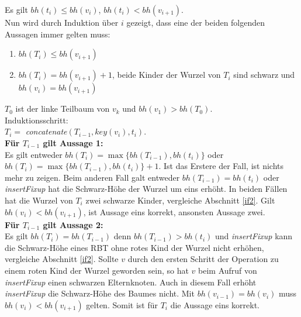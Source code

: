 \documentclass[a4paper,12pt]{article}
\begin{document}
\noindent Es gilt $\mathit{bh} \left(t_i \right) \leq \mathit{bh} \left(v_{i} \right)$, $\mathit{bh} \left(t_i \right) < \mathit{bh} \left(v_{i+1} \right)$.\\
Nun wird durch Induktion über $i$ gezeigt, dass eine der beiden folgenden Aussagen immer gelten muss:\\
\bigskip
\begin{enumerate}
	\item  $\mathit{bh} \left(T_{i} \right) \leq  \mathit{bh} \left(v_{i+1} \right)$
	\item $\mathit{bh} \left(T_{i} \right) =  \mathit{bh} \left(v_{i+1} \right) +1$, beide Kinder der Wurzel von $T_i$ sind schwarz und $\mathit{bh} \left(v_{i} \right) = \mathit{bh} \left(v_{i+1} \right)$
\end{enumerate}
$T_0$ ist der linke Teilbaum von $v_k$ und $\mathit{bh} \left(v_{1} \right) > \mathit{bh} \left(T_{0} \right)$.\\
Induktionsschritt:\\
$T_i =$ \textit{concatenate}$\left(T_{i-1}, \textit{key}(v_i), t_i\right)$.\\

\noindent \textbf{Für $T_{i-1}$ gilt Aussage 1:}\\
Es gilt entweder $\mathit{bh} \left(T_{i} \right) = \max\{\mathit{bh} \left(T_{i-1}\right), \mathit{bh} \left(t_{i} \right) \} $  oder \\ $\mathit{bh} \left(T_{i} \right) = \max\{\mathit{bh} \left(T_{i-1}\right), \mathit{bh} \left(t_{i} \right) \} + 1$. Ist das Erstere der Fall, ist nichts mehr zu zeigen. Beim anderen Fall galt entweder  $\mathit{bh} \left(T_{i-1} \right) =  \mathit{bh} \left(t_{i} \right)$ oder \\ \textit{insertFixup} hat die Schwarz-Höhe der Wurzel um eins erhöht. In beiden Fällen hat die Wurzel von $T_i$ zwei schwarze Kinder, vergleiche Abschnitt \ref{if2}. Gilt  $\mathit{bh} \left(v_{i} \right) < \mathit{bh} \left(v_{i+1} \right)$, ist Aussage eins korrekt, ansonsten Aussage zwei.\\

\noindent \textbf{Für $T_{i-1}$ gilt Aussage 2:}\\
 Es gilt $\mathit{bh} \left(T_{i} \right) = \mathit{bh} \left(T_{i-1} \right)$ denn $\mathit{bh} \left(T_{i-1} \right) > \mathit{bh} \left(t_{i} \right)$ und \textit{insertFixup} kann die Schwarz-Höhe eines RBT  ohne rotes Kind der Wurzel nicht erhöhen, vergleiche Abschnitt \ref{if2}. Sollte $v$ durch den ersten Schritt der Operation zu einem roten Kind der Wurzel geworden sein, so hat $v$ beim Aufruf von \textit{insertFixup} einen schwarzen Elternknoten. Auch in diesem Fall erhöht \textit{insertFixup} die Schwarz-Höhe des Baumes nicht. Mit  $\mathit{bh} \left(v_{i-1} \right) = \mathit{bh} \left(v_{i} \right)$ muss  $\mathit{bh} \left(v_{i} \right) < \mathit{bh} \left(v_{i+1} \right)$ gelten. Somit ist für $T_i$ die Aussage eins korrekt.\\
\end{document}
